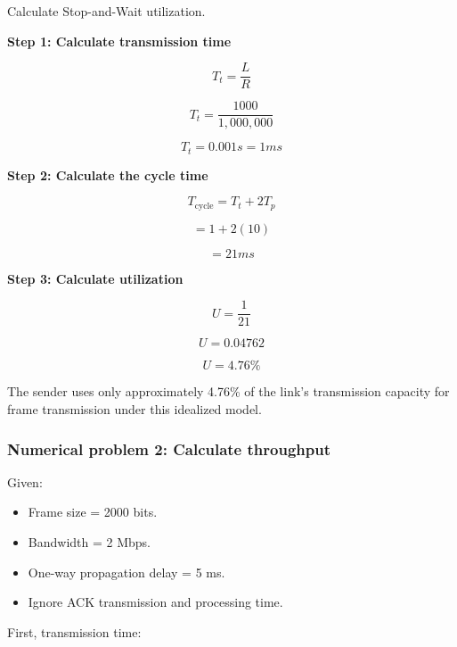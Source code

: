 Calculate Stop-and-Wait utilization.

\textbf{Step 1: Calculate transmission time}



\[
T_t=\frac{L}{R}
\]





\[
T_t=\frac{1000}{1,000,000}
\]





\[
T_t=0.001s=1ms
\]



\textbf{Step 2: Calculate the cycle time}



\[
T_{\text{cycle}}=T_t+2T_p
\]





\[
=1+2(10)
\]





\[
=21ms
\]



\textbf{Step 3: Calculate utilization}



\[
U=\frac{1}{21}
\]





\[
U=0.04762
\]





\[
\boxed{U=4.76\%}
\]



The sender uses only approximately 4.76\% of the link's transmission capacity for frame transmission under this idealized model.

\subsubsection{Numerical problem 2: Calculate throughput}

Given:

\begin{itemize}
\item Frame size = 2000 bits.
\item Bandwidth = 2 Mbps.
\item One-way propagation delay = 5 ms.
\item Ignore ACK transmission and processing time.
\end{itemize}

First, transmission time:



